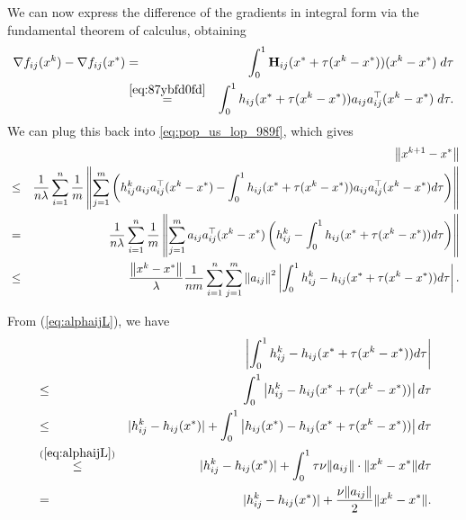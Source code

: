 \documentclass[12pt]{article}
\newcommand{\norm}[1]{\left\|#1\right\|}
\newcommand{\mH}{\mathbf{H}}
\begin{document}
\noindent We can now express the difference of the gradients in integral form via the fundamental theorem of calculus, obtaining 
\begin{eqnarray*} \nabla f_{ij}(x^k) - \nabla f_{ij}(x^*) &=&   \int_{0}^1 \mH_{ij} (x^* + \tau(x^k - x^*)) (x^k - x^*) \; d\tau \\
&\overset{\eqref{eq:87ybfd0fd}}{=} & \int_{0}^1 h_{ij}(x^* + \tau(x^k - x^*)) a_{ij}a_{ij}^\top  (x^k - x^*)\; d\tau .\end{eqnarray*}
We can plug this back into \eqref{eq:pop_us_lop_989f}, which gives
\begin{eqnarray}	
&&\norm{ x^{k+1} - x^* }\notag\\
&\leq & 
 \frac{1}{n \lambda} \sum_{i=1}^n \frac{1}{m} \left\|  \sum_{j=1}^{m} \left(  h_{ij}^k a_{ij}a_{ij}^\top (x^k - x^*)-  \int_{0}^1 h_{ij} (x^* + \tau(x^k - x^*))a_{ij}a_{ij}^\top (x^k - x^*)d\tau  \right)   \right\| \notag \\ 
	&=& \frac{1}{n \lambda} \sum_{i=1}^n \frac{1}{m} \left\|  \sum_{j=1}^{m}  a_{ij}a_{ij}^\top (x^k - x^*)\left( h_{ij}^k- \int_{0}^1 h_{ij}(x^* + \tau(x^k - x^*))  d\tau \right) \right\|\notag \\ 
	&\leq& \frac{ \norm{x^k - x^*}}{ \lambda} \frac{1}{nm} \sum_{i=1}^n \sum_{j=1}^{m} \norm{a_{ij}}^2 \left|   \int_{0}^1 h_{ij}^k - h_{ij}(x^* + \tau(x^k - x^*))  d\tau  \right|. \label{petrol-09809fd}
\end{eqnarray}

\noindent From (\ref{eq:alphaijL}), we have 
\begin{eqnarray}
	&&\left|   \int_{0}^1 h_{ij}^k - h_{ij}(x^* + \tau(x^k - x^*))  d\tau  \right|\notag\\
	&\leq& \int_{0}^1 \left|  h_{ij}^k - h_{ij}(x^* + \tau(x^k - x^*))   \right| d\tau \notag \\
	&\leq& |h_{ij}^k - h_{ij}(x^*)| + \int_{0}^1 \left|  h_{ij}(x^*) -  h_{ij}(x^* + \tau(x^k - x^*))   \right| d \tau \notag \\ 
	&\overset{(\ref{eq:alphaijL})}{\leq}&  |h_{ij}^k - h_{ij}(x^*)| + \int_{0}^1 \tau \nu \|a_{ij}\| \cdot \|x^k - x^*\| d\tau  \notag \\ 
	&=&  |h_{ij}^k - h_{ij}(x^*)| + \frac{\nu \|a_{ij}\|}{2} \|x^k-x^*\|. \label{eq:olive-09u0hfdih}
\end{eqnarray}
\end{document}
